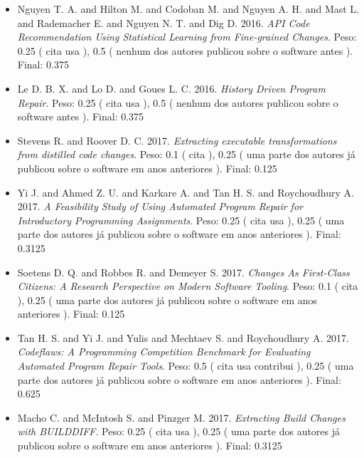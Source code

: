 \begin{itemize}
\item Nguyen T. A. and Hilton M. and Codoban M. and Nguyen A. H. and Mast L. and Rademacher E. and Nguyen N. T. and Dig D.
      2016.
        \textit{ API Code Recommendation Using Statistical Learning from Fine-grained Changes}.
      Peso:
      0.25 (
          cita
          usa
      ),
      0.5 (
nenhum dos autores publicou sobre o software antes
      ).
      Final:
      0.375

\item Le D. B. X. and Lo D. and Goues L. C.
      2016.
        \textit{ History Driven Program Repair}.
      Peso:
      0.25 (
          cita
          usa
      ),
      0.5 (
nenhum dos autores publicou sobre o software antes
      ).
      Final:
      0.375

\item Stevens R. and Roover D. C.
      2017.
        \textit{ Extracting executable transformations from distilled code changes}.
      Peso:
      0.1 (
          cita
      ),
      0.25 (
uma parte dos autores já publicou sobre o software em anos anteriores
      ).
      Final:
      0.125

\item Yi J. and Ahmed Z. U. and Karkare A. and Tan H. S. and Roychoudhury A.
      2017.
        \textit{ A Feasibility Study of Using Automated Program Repair for Introductory Programming Assignments}.
      Peso:
      0.25 (
          cita
          usa
      ),
      0.25 (
uma parte dos autores já publicou sobre o software em anos anteriores
      ).
      Final:
      0.3125

\item Soetens D. Q. and Robbes R. and Demeyer S.
      2017.
        \textit{ Changes As First-Class Citizens: A Research Perspective on Modern Software Tooling}.
      Peso:
      0.1 (
          cita
      ),
      0.25 (
uma parte dos autores já publicou sobre o software em anos anteriores
      ).
      Final:
      0.125

\item Tan H. S. and Yi J. and Yulis and Mechtaev S. and Roychoudhury A.
      2017.
        \textit{ Codeflaws: A Programming Competition Benchmark for Evaluating Automated Program Repair Tools}.
      Peso:
      0.5 (
          cita
          usa
          contribui
      ),
      0.25 (
uma parte dos autores já publicou sobre o software em anos anteriores
      ).
      Final:
      0.625

\item Macho C. and McIntosh S. and Pinzger M.
      2017.
        \textit{ Extracting Build Changes with BUILDDIFF}.
      Peso:
      0.25 (
          cita
          usa
      ),
      0.25 (
uma parte dos autores já publicou sobre o software em anos anteriores
      ).
      Final:
      0.3125


\end{itemize}
